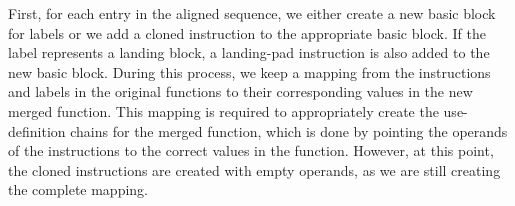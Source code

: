 %
%
%
%

First, for each entry in the aligned sequence, we either create a new basic
block for labels or we add a cloned instruction to the appropriate basic
block.
If the label represents a landing block, a landing-pad instruction is also added
to the new basic block.
During this process, we keep a mapping from the instructions and labels in the
original functions to their corresponding values in the new merged function.
This mapping is required to appropriately create the use-definition
chains for the merged function, which is done by pointing the operands of the
instructions to the correct values in the function.
However, at this point, the cloned instructions are created with empty operands,
as we are still creating the complete mapping.

